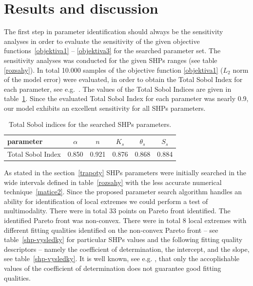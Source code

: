 \documentclass[review]{myarticle}
\begin{document}
\section{Results and discussion} %
The first step in parameter identification should always be the sensitivity analyses in order to evaluate the sensitivity of the given objective functions~\eqref{objektiva1} -- \eqref{objektiva3} for the searched parameter set. The sensitivity analyses was conducted for the given SHPs ranges (see table \ref{rozsahy}). In total 10.000 samples of the objective function \eqref{objektiva1} ($L_2$ norm of the model error) were evaluated, in order to obtain the  Total Sobol Index for each parameter, see e.g.~\citep{kniha-citlivost}. The values of the Total Sobol Indices are given in table~\ref{citlivost}. Since the evaluated Total Sobol Index for each parameter was nearly 0.9, our model exhibits an excellent sensitivity for all SHPs parameters.

\begin{table}[ht]
\begin{center}
\caption{Total Sobol indices for the searched SHPs parameters.}
\begin{small}
\doublespacing
\begin{tabular}{l||c c c c c}
\toprule
parameter & $\alpha$ & $n$ & $K_s$ & $\theta_s$ & $S_s$ \\ \hline
\toprule
Total Sobol Index & 0.850 & 0.921 & 0.876 & 0.868 & 0.884 \\
\toprule
\end{tabular}
\end{small}
\label{citlivost}
\end{center}
\end{table}

As stated in the section~\ref{trapoty} SHPs parameters were initially searched in the wide intervals defined in table~\ref{rozsahy} with the less accurate numerical technique~\eqref{matice2}. Since the proposed parameter search algorithm handles an ability for identification of  local extremes we could perform a test of multimodality. 
There were in total 33 points on Pareto front identified. The identified Pareto front was non-convex. 
There were in total 8 local extremes  with different fitting qualities identified on the non-convex Pareto front -- see table~\ref{shp-vysledky} for particular SHPs values and the following fitting quality descriptors -- namely the coefficient of determination, the intercept, and the slope, see table~\ref{shp-vysledky}. It is well known, see e.g. \citep{r2andslope}, that only the accoplishable values of the coefficient of determination does not guarantee good fitting qualities.
\end{document}
